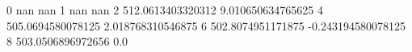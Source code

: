 0 nan nan
1 nan nan
2 512.0613403320312 9.010650634765625
4 505.0694580078125 2.018768310546875
6 502.8074951171875 -0.243194580078125
8 503.0506896972656 0.0
